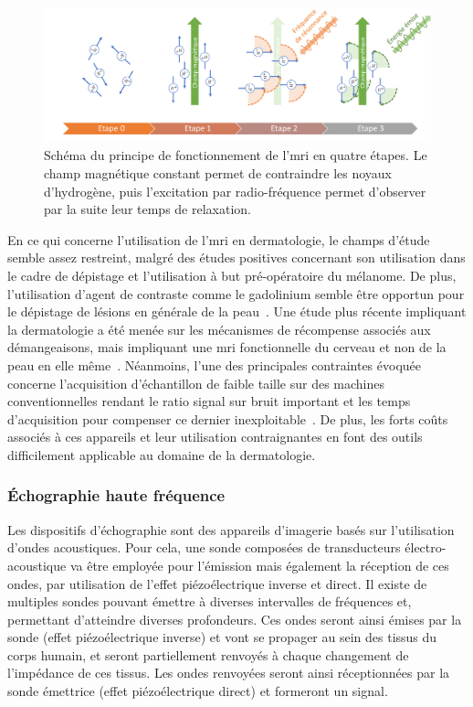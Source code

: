 \begin{figure}[H]
    \centering
    \includegraphics[width=\linewidth]{contents/chapter_2/resources/scheme_principle_mri.pdf}
    \caption{Schéma du principe de fonctionnement de l'\gls{mri} en quatre étapes. Le champ magnétique constant permet de contraindre les noyaux d'hydrogène, puis l'excitation par radio-fréquence permet d'observer par la suite leur temps de relaxation.}
    \label{fig:scheme_principle_mri}
\end{figure}\par

En ce qui concerne l'utilisation de l'\gls{mri} en dermatologie, le champs d'étude semble assez restreint, malgré des études positives concernant son utilisation dans le cadre de dépistage et l'utilisation à but pré-opératoire du mélanome. De plus, l'utilisation d'agent de contraste comme le gadolinium semble être opportun pour le dépistage de lésions en générale de la peau~\cite{Zemtsov1993}. Une étude plus récente impliquant la dermatologie a été menée sur les mécanismes de récompense associés aux démangeaisons, mais impliquant une \gls{mri} fonctionnelle du cerveau et non de la peau en elle même~\cite{Mueller2017}. Néanmoins, l'une des principales contraintes évoquée concerne l'acquisition d'échantillon de faible taille sur des machines conventionnelles rendant le ratio signal sur bruit important et les temps d'acquisition pour compenser ce dernier inexploitable~\cite{Gobel2016}. De plus, les forts coûts associés à ces appareils et leur utilisation contraignantes en font des outils difficilement applicable au domaine de la dermatologie.\par

\subsubsection{Échographie haute fréquence}
Les dispositifs d'échographie sont des appareils d'imagerie basés sur l'utilisation d'ondes acoustiques. Pour cela, une sonde composées de transducteurs électro-acoustique va être employée pour l'émission mais également la réception de ces ondes, par utilisation de l'effet piézoélectrique inverse et direct. Il existe de multiples sondes pouvant émettre à diverses intervalles de fréquences et, permettant d'atteindre diverses profondeurs. Ces ondes seront ainsi émises par la sonde (effet piézoélectrique inverse) et vont se propager au sein des tissus du corps humain, et seront partiellement renvoyés à chaque changement de l'impédance de ces tissus. Les ondes renvoyées seront ainsi réceptionnées par la sonde émettrice (effet piézoélectrique direct) et formeront un signal.\par

